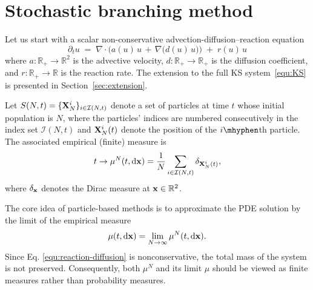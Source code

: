 \documentclass[preprint,12pt]{elsarticle}
\theoremstyle{definition}
\theoremstyle{remark}
\begin{document}
\section{Stochastic branching method}

Let us start with a scalar non-conservative advection-diffusion–reaction equation
\begin{equation}\label{equ:reaction-diffusion}
  \partial_t u \;=\; \nabla \!\cdot\! \big( a(u)\,u \,+\, \nabla\big(d(u)\,u\big) \big) \;+\; r(u)\,u
\end{equation}
where $a:\mathbb{R}_{+}\!\to\!\mathbb{R}^2$ is the advective velocity, $d:\mathbb{R}_{+}\!\to\!\mathbb{R}_{+}$ is the diffusion coefficient, and $r:\mathbb{R}_{+}\!\to\!\mathbb{R}$ is the reaction rate. The extension to the full KS system~\eqref{equ:KS} is presented in Section~\ref{sec:extension}.



Let $S(N,t)=\{\mathbf{X}_N^i\}_{i\in\mathcal I(N,t)}$ denote a set of particles at time $t$ whose initial population is $N$, where the particles' indices are numbered consecutively in the index set $\mathcal I(N,t)$ and $\mathbf{X}_N^i(t)$ denote the position of the $i\mhyphen$th particle. The associated empirical (finite) measure is
\begin{equation}
    t \to \mu^N(t,\mathrm{d} \mathbf{x}) =  \frac{1}{N}\sum_{i\in \mathcal I(N,t)}\delta_{\mathbf{X}_N^i(t)},
\end{equation}
where $\delta_{\mathbf{x}} $ denotes the Dirac measure at $\mathbf{x}\in \mathbb {R}^2$. 

The core idea of particle-based methods is to approximate the PDE solution by the limit of the empirical measure
\[
\mu(t,\mathrm{d}\mathbf{x}) = \lim_{N\to\infty} \mu^N(t,\mathrm{d}\mathbf{x}).
\]
Since Eq. \ref{equ:reaction-diffusion} is nonconservative, the total mass of the system is not preserved. Consequently, both $\mu^N$ and its limit $\mu$ should be viewed as finite measures rather than probability measures.
\end{document}
